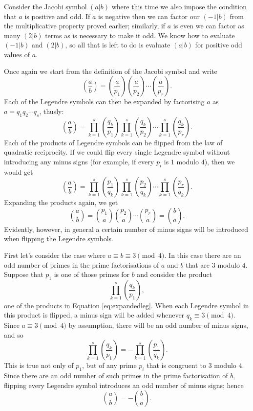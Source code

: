 \documentclass[a4paper]{article}
\newcommand{\leg}[2]{\left(\frac{#1}{#2}\right)}
\newcommand{\ileg}[2]{(#1|#2)}
\begin{document}
Consider the Jacobi symbol \(\ileg{a}{b}\) where this time we
also impose the condition that \(a\) is positive and odd. If
\(a\) is negative then we can factor our \(\ileg{-1}{b}\) from
the multiplicative property proved earlier; similarly, if 
\(a\) is even we can factor as many \(\ileg{2}{b}\) terms as is
necessary to make it odd. We know how to evaluate \(\ileg{-1}{b}\) and \(\ileg{2}{b}\),
so all that is left to do is evaluate \(\ileg{a}{b}\) for positive odd 
values of \(a\).

Once again we start from the definition of the Jacobi symbol and write
\[\leg{a}{b}=\leg{a}{p_1}\leg{a}{p_2}\cdots\leg{a}{p_r}.\]
Each of the Legendre symbols can then be expanded by factorising
\(a\) as \(a=q_1q_2\cdots q_s\), thusly:
\begin{equation}\label{eq:expandedleg}
	\leg{a}{b}=\prod_{k=1}^s\leg{q_k}{p_1}\prod_{k=1}^s\leg{q_k}{p_2}\cdots\prod_{k=1}^s\leg{q_k}{p_r}.
\end{equation}
Each of the products of Legendre symbols can be flipped from
the law of quadratic reciprocity. If we could flip every single
Legendre symbol without introducing any minus signs (for example, if every
\(p_i\) is \(1\) modulo \(4\)), then we would get
\[\leg{a}{b}=\prod_{k=1}^s\leg{p_1}{q_k}\prod_{k=1}^s\leg{p_2}{q_k}\cdots\prod_{k=1}^s\leg{p_r}{q_k}.\]
Expanding the products again, we get
\[\leg{a}{b}=\leg{p_1}{a}\leg{p_2}{a}\cdots\leg{p_r}{a}=\leg{b}{a}.\]
Evidently, however, in general a certain number of minus signs will be introduced
when flipping the Legendre symbols.

First let's consider the case where \(a\equiv b\equiv3\pmod{4}\).
In this case there are an odd number of primes in the prime factorisations
of \(a\) and \(b\) that are \(3\) modulo \(4\). Suppose that \(p_1\) is 
one of those primes for \(b\) and consider the product
\[\prod_{k=1}^s\leg{q_k}{p_1},\]
one of the products in Equation \eqref{eq:expandedleg}.
When each Legendre symbol in this product is flipped, a minus sign
will be added whenever \(q_k\equiv3\pmod{4}\). Since \(a\equiv3\pmod{4}\)
by assumption, there will be an odd number of minus signs, and so
\[\prod_{k=1}^s\leg{q_k}{p_1}=-\prod_{k=1}^s\leg{p_1}{q_k}.\]
This is true not only of \(p_1\), but of any prime \(p_i\) that
is congruent to \(3\) modulo \(4\). Since there are an odd number
of such primes in the prime factorisation of \(b\), flipping
every Legendre symbol introduces an odd number of minus signs; hence
\[\leg{a}{b}=-\leg{b}{a}.\]
\end{document}
